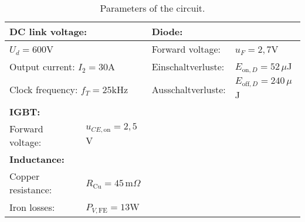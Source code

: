       \begin{table}[h]
        \centering  %
                \begin{tabular}{|l|l|l|l|}
            \hline
            \multicolumn{2}{|l|}{\textbf{DC link voltage:}} & \multicolumn{2}{l|}{\textbf{Diode:}} \\
            \hline
            \multicolumn{2}{|l|}{$U_d = 600$V} & Forward voltage: & $u_F = 2{,}7$V \\
            \hline
            \multicolumn{2}{|l|}{Output current: $I_2 = 30$A} & Einschaltverluste: & $E_{\text{on},D} = 52\,\mu$J \\
            \hline
            \multicolumn{2}{|l|}{Clock frequency: $f_T = 25$kHz} & Ausschaltverluste: & $E_{\text{off},D} = 240\,\mu$J \\
            \hline
            \multicolumn{2}{|l|}{\textbf{IGBT:}} & \multicolumn{2}{l|}{} \\
            \hline
            Forward voltage: & $u_{CE,\text{on}} = 2{,}5$V & \multicolumn{2}{l|}{} \\
            \hline
            \multicolumn{2}{|l|}{\textbf{Inductance:}} & \multicolumn{2}{l|}{} \\
            \hline
            Copper resistance: & $R_{\text{Cu}} = 45$\,m$\Omega$ & \multicolumn{2}{l|}{} \\
            \hline
            Iron losses: & $P_{V,\text{FE}} = 13$W & \multicolumn{2}{l|}{} \\
            \hline
        \end{tabular}
        \caption{Parameters of the circuit.}  %
    \end{table}

